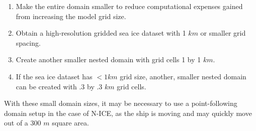 \begin{enumerate}
    \item Make the entire domain smaller to reduce computational expenses gained from increasing the model grid size.
    \item Obtain a high-resolution gridded sea ice dataset with 1 $km$ or smaller grid spacing.
    \item Create another smaller nested domain with grid cells 1 by 1 $km$. 
    \item If the sea ice dataset has $< 1 km$ grid size, another, smaller nested domain can be created with .3 by .3 $km$ grid cells.
\end{enumerate}

With these small domain sizes, it may be necessary to use a point-following domain setup in the case of N-ICE, as the ship is moving and may quickly move out of a 300 $m$ square area. 

